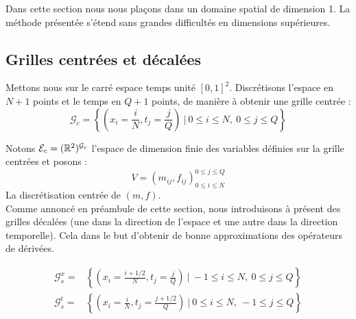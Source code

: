 \documentclass[a4paper,12pt]{article}
\begin{document}
Dans cette section nous nous plaçons dans un domaine spatial de dimension 1. La méthode présentée s'étend sans grandes difficultés en dimensions supérieures. 

\subsection{Grilles centrées et décalées}
Mettons nous sur le carré espace temps unité $[0,1]^2$. Discrétisons l'espace en $N+1$ points et le temps en $Q+1$ points, de manière à obtenir une grille centrée :
$$
\mathcal{G}_c = \left\{(x_i=\frac{i}{N},t_j=\frac{j}{Q})\ |\ 0\leq i\leq N,\ 0\leq j\leq Q\right\}
$$


Notons $\mathcal{E}_c=(\mathbb{R}^2)^{\mathcal{G}_c}$ l'espace de dimension finie des variables définies sur la grille centrées et posons : 
$$
V = (m_{ij},f_{ij})_{0\leq i\leq N}^{0\leq j\leq Q}
$$
La discrétisation centrée de $(m,f)$. \\

Comme annoncé en préambule de cette section, nous introduisons à présent des grilles décalées (une dans la direction de l'espace et une autre dans la direction temporelle). Cela dans le but d'obtenir de bonne approximations des opérateurs de dérivées. 

\begin{align}
\mathcal{G}_s^x = &\left\{(x_i=\frac{i+1/2}{N},t_j=\frac{j}{Q})\ |\ -1\leq i\leq N,\ 0\leq j\leq Q\right\} \\
\mathcal{G}_s^t = &\left\{(x_i=\frac{i}{N},t_j=\frac{j+1/2}{Q})\ |\ 0\leq i\leq N,\ -1\leq j\leq Q\right\}
\end{align}
\end{document}
